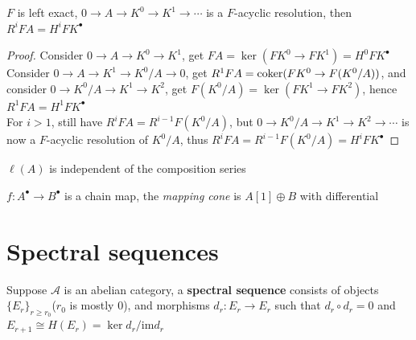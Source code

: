 \documentclass[main]{subfiles}
\begin{document}
\begin{proposition}
$F$ is left exact, $0\to A\to K^0\to K^1\to\cdots$ is a $F$-acyclic resolution, then $R^iFA=H^iFK^\bullet$
\end{proposition}

\begin{proof}
Consider $0\to A\to K^0\to K^1$, get $FA=\ker(FK^0\to FK^1)=H^0FK^\bullet$ \\
Consider $0\to A\to K^1\to K^0/A\to 0$, get $R^1FA=\operatorname{coker}(FK^0\to F(K^0/A))$, and consider $0\to K^0/A\to K^1\to K^2$, get $F(K^0/A)=\ker(FK^1\to FK^2)$, hence $R^1FA=H^1FK^\bullet$ \\
For $i>1$, still have $R^iFA=R^{i-1}F(K^0/A)$, but $0\to K^0/A\to K^1\to K^2\to\cdots$ is now a $F$-acyclic resolution of $K^0/A$, thus $R^iFA=R^{i-1}F(K^0/A)=H^iFK^\bullet$
\end{proof}

\begin{lemma}
$\ell(A)$ is independent of the composition series
\end{lemma}

\begin{definition}
$f:A^\bullet\to B^\bullet$ is a chain map, the \textit{mapping cone} is $A[1]\oplus B$ with differential
\end{definition}

\newpage

\section{Spectral sequences}

\begin{definition}
Suppose $\mathscr A$ is an abelian category, a \textbf{spectral sequence} consists of objects $\{E_r\}_{r\geq r_0}$($r_0$ is mostly $0$), and morphisms $d_r:E_r\to E_r$ such that $d_r\circ d_r=0$ and $E_{r+1}\cong H(E_r)=\ker d_r/\mathrm{im}d_r$
\end{definition}
\end{document}

